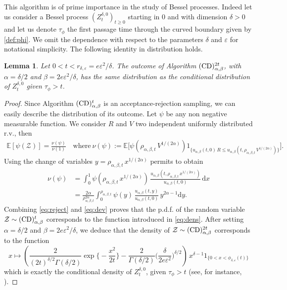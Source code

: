 \documentclass[12pt]{article}
\newcommand{\dint}{\mathrm{d}}
\newtheorem{lemma}[thm]{Lemma}
\numberwithin{equation}{section}
\begin{document}
This algorithm is of prime importance in the study of Bessel processes. Indeed let us consider a Bessel process $(Z^{\delta,0}_t)_{t\ge 0}$ starting in $0$ and with dimension $\delta>0$ and let us denote $\tau_\phi$ the first passage time through the curved boundary given by \eqref{def:phi}. We omit the dependence with respect to the parameters $\delta$ and $\varepsilon$ for notational simplicity. The following identity in distribution holds.
\begin{lemma} Let $0<t<r_{\delta,\varepsilon}=e\varepsilon^2/\delta$. The outcome of Algorithm $({\rm CD})_{\alpha,\beta}^{2t}$, with $\alpha=\delta/2$ and $\beta=2e\varepsilon^2/\delta$, has the same distribution as the conditional distribution of $Z_t^{\delta,0}$ given $\tau_\phi>t$.
\label{lem:identlaw}
\end{lemma}
\begin{proof} Since Algorithm $({\rm CD})_{\alpha,\beta}^t$ is an acceptance-rejection sampling, we can easily describe the distribution of its outcome. Let $\psi$ be any non negative measurable function. We consider $R$ and $V$ two independent uniformly distributed r.v., then
\begin{align}
\mathbb{E}[\psi(\mathcal{Z})]=\frac{\nu(\psi)}{\nu(1)}\quad\mbox{where}\
\nu(\psi):=\mathbb{E}\Big[\psi(\rho_{\alpha,\beta,t}\,V^{1/(2\alpha)}) 1_{\{ u_{\alpha,\beta}(t,0)\, R\le  u_{\alpha,\beta}(t,\rho_{\alpha,\beta,t}\,V^{1/(2\alpha)}) \}}\Big].
\label{eq:reject}
\end{align}
Using the change of variables $y=\rho_{\alpha,\beta,t}\,x^{1/(2\alpha)}$ permits to obtain
\begin{align}
\nu(\psi)&=\int_0^1\psi(\rho_{\alpha,\beta,t}\,x^{1/(2\alpha)})\,\frac{u_{\alpha,\beta}(t,\rho_{\alpha,\beta,t}\,x^{1/(2\alpha)})}{u_{\alpha,\beta}(t,0)}\,\dint x\nonumber\\
&=\frac{2\alpha}{\rho_{\alpha,\beta,t}^{2\alpha}}\int_0^{\rho_{\alpha,\beta,t}}\psi(y)\,\frac{u_{\alpha,\beta}(t,y)}{u_{\alpha,\beta}(t,0)}\,y^{2\alpha-1}\dint y.\label{eq:dev}
\end{align}
Combining \eqref{eq:reject} and \eqref{eq:dev} proves that the p.d.f. of the random variable $\mathcal{Z}\sim({\rm CD})_{\alpha,\beta}^t$ corresponds to the function introduced in \eqref{eq:dens}. After setting $\alpha=\delta/2$ and $\beta=2e\varepsilon^2/\delta$, we deduce that the density of  $\mathcal{Z}\sim({\rm CD})_{\alpha,\beta}^{2t}$ corresponds to the function
\[
x\mapsto \left(\frac{2}{(2t)^{\delta/2}\Gamma(\delta/2)}\exp\Big\{ -\frac{x^2}{2t} \Big\}-\frac{2}{\Gamma(\delta/2)}\Big(\frac{\delta}{2e\varepsilon^2}\Big)^{\delta/2}\right)\, x^{\delta-1}1_{\{0<x<\phi_{\delta,\varepsilon}(t)\}}
\]
which is exactly the conditional density of $Z_t^{\delta,0}$, given $\tau_\phi>t$ (see, for instance, \cite{Deaconu-Herrmann-2017}).
\end{proof}
\end{document}
